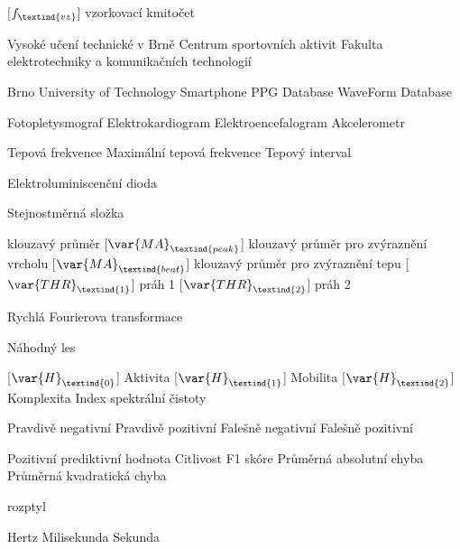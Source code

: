 \cleardoublepage
\chapter*{\listofabbrevname}
{}

\begin{acronym}[KolikMista]	%

		[\ensuremath{f_\textind{vz}}]
		{vzorkovací kmitočet}

			{Vysoké učení technické v Brně}
			{Centrum sportovních aktivit}
			{Fakulta elektrotechniky a komunikačních technologií}

		{Brno University of Technology Smartphone PPG Database}
			{WaveForm Database}

			{Fotopletysmograf}
			{Elektrokardiogram}
			{Elektroencefalogram}
			{Akcelerometr}

			{Tepová frekvence}
			{Maximální tepová frekvence}
			{Tepový interval}

			{Elektroluminiscenční dioda}

			{Stejnostměrná složka}

			{klouzavý průměr}
		[\ensuremath{\var{MA}_\textind{peak}}]
			{klouzavý průměr pro zvýraznění vrcholu}
		[\ensuremath{\var{MA}_\textind{beat}}]
		{klouzavý průměr pro zvýraznění tepu}
		[\ensuremath{\var{THR}_\textind{1}}]
		{práh 1}
		[\ensuremath{\var{THR}_\textind{2}}]
		{práh 2}
	
			{Rychlá Fourierova transformace}

			{Náhodný les}

		[\ensuremath{\var{H}_\textind{0}}]
		{Aktivita}
		[\ensuremath{\var{H}_\textind{1}}]
		{Mobilita}
		[\ensuremath{\var{H}_\textind{2}}]
		{Komplexita}
			{Index spektrální čistoty}

			{Pravdivě negativní}
			{Pravdivě pozitivní}
			{Falešně negativní}
			{Falešně pozitivní}

			{Pozitivní prediktivní hodnota}
			{Citlivost}
			{F1 skóre}
			{Průměrná absolutní chyba}
			{Průměrná kvadratická chyba}

			{rozptyl}

			{Hertz}
			{Milisekunda}
			{Sekunda}


\end{acronym}
